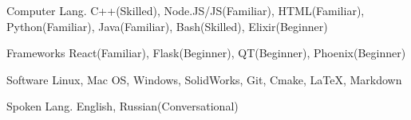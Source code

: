 

\begin{cvskills}

  \cvskill
    {Computer Lang.} %
    {C++(Skilled), Node.JS/JS(Familiar), HTML(Familiar), Python(Familiar), Java(Familiar), Bash(Skilled), Elixir(Beginner)} %

\cvskill
  {Frameworks\phantom{aaa}} %
  {React(Familiar), Flask(Beginner), QT(Beginner), Phoenix(Beginner)} %

  \cvskill
    {Software\phantom{aaaaaa}} %
    {Linux, Mac OS, Windows, SolidWorks, Git, Cmake, LaTeX, Markdown} %

  \cvskill
    {Spoken Lang.\phantom{aa}} %
    {English, Russian(Conversational)} %

\end{cvskills}
